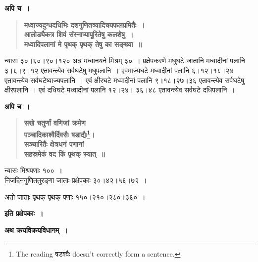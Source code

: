 \documentclass[11pt, openany]{book}
\begin{document}
\newpage

\noindent \textbf{अपि च~।}

 \label{Ex 2.2}
\begin{quote}
\textbf{{\color{red}मध्वाज्यदुग्धदधिभिः दशगुणितत्र्यादिचयफलप्रमितैः~।\\
आलोड्यैकत्र शिवं संस्नाप्यापूरितेषु कलशेषु~।\\
मध्वादिपलानां मे पृथक् पृथक् तेषु का सङ्ख्या~॥}}
\end{quote}

\begin{sloppypar}
न्यासः ३०।६०।९०।१२० अत्र मध्वानयने मिश्रम् ३०~। प्रक्षेपकरणे मधुघटे जातानि मध्वादीनां पलानि ३।६।९।१२ एतावन्त्येव सर्वघटेषु मधुपलानि~। एवमाज्यघटे मध्वादीनां पलानि ६।१२।१८।२४ एतावन्त्येव सर्वघटेष्वाज्यपलानि~। एवं क्षीरघटे मध्वादीनां पलानि ९।१८।२७।३६ एतावन्त्येव सर्वघटेषु क्षीरपलानि~। एवं दधिघटे मध्वादीनां पलानि १२।२४। ३६।४८ एतावन्त्येव सर्वघटे दधिपलानि~।\\
\end{sloppypar}

\noindent \textbf{अपि च~।}

 \label{Ex 2.3}
\begin{quote}
\textbf{{\color{red}सखे चतुर्णां वणिजां क्रमेण \\
पञ्चादिकाश्वैर्दिवसैः षडाद्यैः\renewcommand{\thefootnote}{$\star$}\footnote{The reading षडश्वैः doesn’t correctly form a sentence.}।\\
सञ्चारितैः क्षेत्रधनं पणानां \\
सहस्रमेकं वद किं पृथक् स्यात्~॥}}
\end{quote}

न्यासः \; मिश्रपणाः १००~।\\

निजदिनगुणिततुरङ्गा जाताः प्रक्षेपकाः ३०।४२।५६।७२~।
\vspace{2mm}

अतो जाताः पृथक् पृथक् पणाः १५०।२१०।२८०।३६०~।

\begin{center}
\textbf{इति प्रक्षेपकाः~।}\\
\vspace{6mm}

{\large \textbf{अथ क्रयविक्रयविधानम्~।}}
\end{center}
\end{document}
